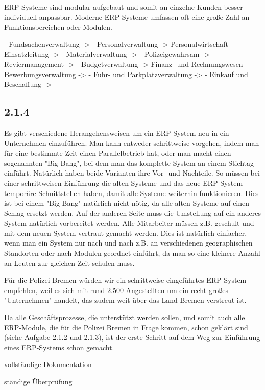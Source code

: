 \documentclass[12pt,utf8]{scrartcl}
\begin{document}
ERP-Systeme sind modular aufgebaut und somit an einzelne Kunden besser individuell anpassbar. Moderne ERP-Systeme umfassen oft eine große Zahl an Funktionsbereichen oder Modulen. 

- Fundsachenverwaltung -> 
- Personalverwaltung -> Personalwirtschaft
- Einsatzleitung -> 
- Materialverwaltung -> 
- Polizeigewahrsam -> 
- Reviermanagement -> 
- Budgetverwaltung -> Finanz- und Rechnungswesen
- Bewerbungsverwaltung -> 
- Fuhr- und Parkplatzverwaltung -> 
- Einkauf und Beschaffung -> 

\subsection*{2.1.4}

Es gibt verschiedene Herangehensweisen um ein ERP-System neu in ein Unternehmen einzuführen. Man kann entweder schrittweise vorgehen, indem man für eine bestimmte Zeit einen Parallelbetrieb hat, oder man macht einen sogenannten "Big Bang", bei dem man das komplette System an einem Stichtag einführt. Natürlich haben beide Varianten ihre Vor- und Nachteile. So müssen bei einer schrittweisen Einführung die alten Systeme und das neue ERP-System temporäre Schnittstellen haben, damit alle Systeme weiterhin funktionieren. Dies ist bei einem "Big Bang" natürlich nicht nötig, da alle alten Systeme auf einen Schlag ersetzt werden. Auf der anderen Seite muss die Umstellung auf ein anderes System natürlich vorbereitet werden. Alle Mitarbeiter müssen z.B. geschult und mit dem neuen System vertraut gemacht werden. Dies ist natürlich einfacher, wenn man ein System nur nach und nach z.B. an verschiedenen geographischen Standorten oder nach Modulen geordnet einführt, da man so eine kleinere Anzahl an Leuten zur gleichen Zeit schulen muss\cite{Jacob2008}. 

Für die Polizei Bremen würden wir ein schrittweise eingeführtes ERP-System empfehlen, weil es sich mit rund 2.500 Angestellten um ein recht großes "Unternehmen" handelt, das zudem weit über das Land Bremen verstreut ist\cite{PolizeiBremen}. 

Da alle Geschäftsprozesse, die unterstützt werden sollen, und somit auch alle ERP-Module, die für die Polizei Bremen in Frage kommen, schon geklärt sind (siehe Aufgabe 2.1.2 und 2.1.3), ist der erste Schritt auf dem Weg zur Einführung eines ERP-Systems schon gemacht. 

vollständige Dokumentation

ständige Überprüfung\cite{Foerster2008}

\newpage
\begin{flushleft}

\end{flushleft}
\end{document}
